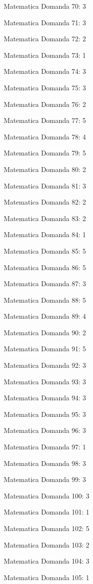 \documentclass[20pt, a4paper]{article}
\begin{document}
\begin{itemize}[leftmargin=*]
\item [Matematica] Domanda 70: 3
\item [Matematica] Domanda 71: 3
\item [Matematica] Domanda 72: 2
\item [Matematica] Domanda 73: 1
\item [Matematica] Domanda 74: 3
\item [Matematica] Domanda 75: 3
\item [Matematica] Domanda 76: 2
\item [Matematica] Domanda 77: 5
\item [Matematica] Domanda 78: 4
\item [Matematica] Domanda 79: 5
\item [Matematica] Domanda 80: 2
\item [Matematica] Domanda 81: 3
\item [Matematica] Domanda 82: 2
\item [Matematica] Domanda 83: 2
\item [Matematica] Domanda 84: 1
\item [Matematica] Domanda 85: 5
\item [Matematica] Domanda 86: 5
\item [Matematica] Domanda 87: 3
\item [Matematica] Domanda 88: 5
\item [Matematica] Domanda 89: 4
\item [Matematica] Domanda 90: 2
\item [Matematica] Domanda 91: 5
\item [Matematica] Domanda 92: 3
\item [Matematica] Domanda 93: 3
\item [Matematica] Domanda 94: 3
\item [Matematica] Domanda 95: 3
\item [Matematica] Domanda 96: 3
\item [Matematica] Domanda 97: 1
\item [Matematica] Domanda 98: 3
\item [Matematica] Domanda 99: 3
\item [Matematica] Domanda 100: 3
\item [Matematica] Domanda 101: 1
\item [Matematica] Domanda 102: 5
\item [Matematica] Domanda 103: 2
\item [Matematica] Domanda 104: 3
\item [Matematica] Domanda 105: 1

\end{itemize}
\end{document}
